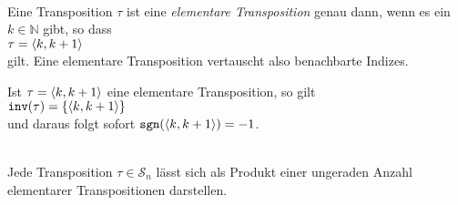 \begin{Definition} \hspace*{\fill} \\
  Eine Transposition $\tau$ ist eine \emph{elementare Transposition} genau dann, wenn es ein 
  $k \in\mathbb{N}$ gibt, so dass 
  \\[0.2cm]
  \hspace*{1.3cm}
  $\tau = \pair(k, k+1)$
  \\[0.2cm]
  gilt.  Eine elementare Transposition vertauscht also benachbarte Indizes.  \eoxs
\end{Definition}

\remark
Ist $\tau = \pair(k, k+1)$ eine elementare Transposition, so gilt
  \\[0.2cm]
  \hspace*{1.3cm}
  $\mathtt{inv}(\tau) = \{ \pair(k, k+1) \}$
  \\[0.2cm]
  und daraus folgt sofort
  $\mathtt{sgn}(\pair(k, k+1)) = -1$.
\eoxs

\begin{Lemma} \hspace*{\fill} \\
  Jede Transposition $\tau \in \mathcal{S}_n$ l\"asst sich als Produkt einer ungeraden Anzahl elementarer Transpositionen
  darstellen.  
\end{Lemma}

